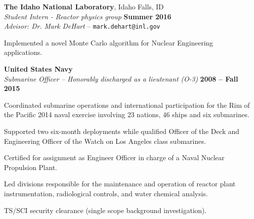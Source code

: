 \documentclass[margin,line]{resume}
\begin{document}
\begin{resume}
\begin{list2}
                \end{list2}

    \textbf{The Idaho National Laboratory}, Idaho Falls, ID \\
                \textsl{Student Intern - Reactor physics group} \hfill
                \textbf{Summer 2016}\\
                \textsl{Advisor: Dr. Mark DeHart} --
                \verb`mark.dehart@inl.gov`
                \begin{list2}
                \item[] Implemented a novel Monte Carlo algorithm for Nuclear
                Engineering applications.
                \end{list2}
    \textbf{United States Navy} \\
    \textsl{Submarine Officer -- Honorably discharged as a lieutenant (O-3)} \hfill \textbf{2008 -- Fall 2015}
    \\\vspace{-3mm}
    \begin{list2}
    \item Coordinated submarine operations and international
      participation for the Rim of the Pacific 2014 naval exercise
      involving 23 nations, 46 ships and six submarines.
    \item Supported two six-month deployments while qualified Officer
      of the Deck and Engineering Officer of the Watch on Los Angeles class submarines.
    \item Certified for assignment as Engineer Officer in charge of a Naval Nuclear Propulsion Plant.
    \item Led divisions responsible for the maintenance and operation of reactor plant instrumentation, radiological controls, and water chemical analysis.
      \item TS/SCI security clearance (single scope background investigation).
          \end{list2}
                

\end{resume}
\end{document}
